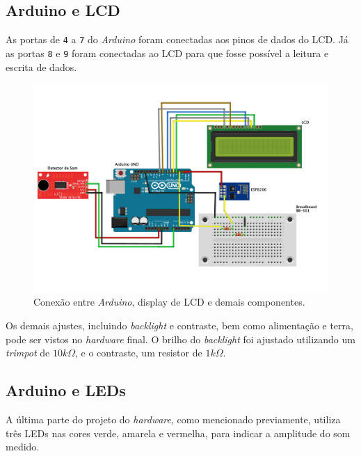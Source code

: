 \documentclass[
    12pt,               %
    openright,          %
    oneside,
    a4paper,            
    english,            %
    brazil              %
    ]{abntex2}
\begin{document}
\subsection{Arduino e LCD}

As portas de \texttt{4} a \texttt{7} do \textit{Arduino} foram conectadas aos pinos de dados do LCD. Já as portas \texttt{8} e \texttt{9} foram conectadas ao LCD para que fosse possível a leitura e escrita de dados.

\begin{figure}[!htb]
  \begin{center}
    \caption{\label{circ-3}Conexão entre \textit{Arduino}, display de LCD e demais componentes.}
    \includegraphics[scale=0.48]{images/circ-3.pdf}
  \end{center}
\end{figure}

Os demais ajustes, incluindo \textit{backlight} e contraste, bem como alimentação e terra, pode ser vistos no \textit{hardware} final. O brilho do \textit{backlight} foi ajustado utilizando um \textit{trimpot} de $10k\Omega$, e o contraste, um resistor de $1k\Omega$.

\subsection{Arduino e LEDs}

A última parte do projeto do \textit{hardware}, como mencionado previamente, utiliza três LEDs nas cores verde, amarela e vermelha, para indicar a amplitude do som medido. 
\end{document}
